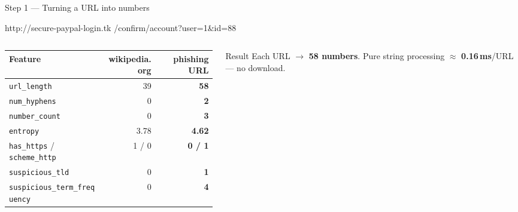 \documentclass[aspectratio=169,11pt,xcolor=table]{beamer}
\begin{document}
\begin{frame}{Step 1 --- Turning a URL into numbers}
\small
\begin{center}
{\ttfamily\footnotesize
\textcolor{Warn}{http://}\textcolor{Accent}{secure-paypal-login}\textcolor{Bad}{.tk}%
\textcolor{Good}{/confirm/account}\textcolor{NavyMid}{?user=1\&id=88}}
\end{center}
\vspace{0.3em}
\renewcommand{\arraystretch}{1.15}
\begin{columns}[T,onlytextwidth]
\begin{column}{0.62\textwidth}
{\footnotesize
\begin{tabular}{@{}lrr@{}}
\toprule
Feature & wikipedia.org & phishing URL \\
\midrule
\texttt{url\_length} & 39 & \textbf{58} \\
\texttt{num\_hyphens} & 0 & \textbf{2} \\
\texttt{number\_count} & 0 & \textbf{3} \\
\texttt{entropy} & 3.78 & \textbf{4.62} \\
\texttt{has\_https} / \texttt{scheme\_http} & 1 / 0 & \textbf{0 / 1} \\
\texttt{suspicious\_tld} & 0 & \textbf{1} \\
\texttt{suspicious\_term\_frequency} & 0 & \textbf{4} \\
\bottomrule
\end{tabular}}
\end{column}
\begin{column}{0.35\textwidth}
  \begin{exampleblock}{Result}
  Each URL $\to$ \textbf{58 numbers}. Pure string processing $\approx$ \textbf{0.16\,ms}/URL --- no download.
  \end{exampleblock}
\end{column}
\end{columns}
\end{frame}
\end{document}
